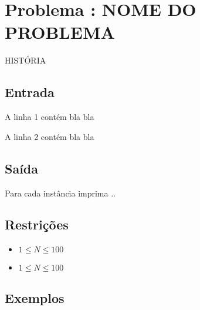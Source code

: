 \section*{Problema \proxLetra: NOME DO PROBLEMA}

% 

HISTÓRIA

\subsection*{Entrada}

A linha 1 contém bla bla

A linha 2 contém bla bla

 
\subsection*{Saída}

Para cada instância imprima ..

\subsection*{Restrições}
\begin{itemize}
  \item $1 \leq N \leq 100$

  \item $1 \leq N \leq 100$
\end{itemize}

\subsection*{Exemplos}



